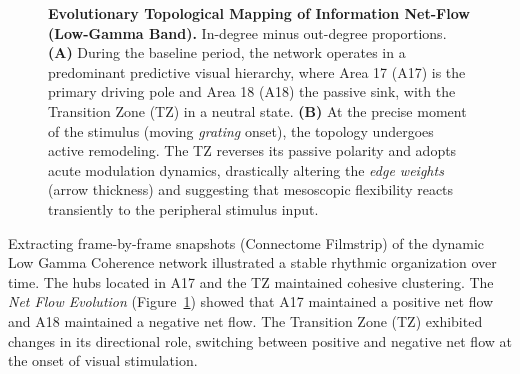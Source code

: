 \begin{figure}[H]
    \caption[Evolutionary Mapping of Net Flow]{\textbf{Evolutionary Topological Mapping of Information Net-Flow (Low-Gamma Band).} In-degree minus out-degree proportions. \textbf{(A)} During the baseline period, the network operates in a predominant predictive visual hierarchy, where Area 17 (A17) is the primary driving pole and Area 18 (A18) the passive sink, with the Transition Zone (TZ) in a neutral state. \textbf{(B)} At the precise moment of the stimulus (moving \textit{grating} onset), the topology undergoes active remodeling. The TZ reverses its passive polarity and adopts acute modulation dynamics, drastically altering the \textit{edge weights} (arrow thickness) and suggesting that mesoscopic flexibility reacts transiently to the peripheral stimulus input.}
    \label{fig:netflow_evolution}
\end{figure}

\vspace{0.5cm}

Extracting frame-by-frame snapshots (Connectome Filmstrip) of the dynamic Low Gamma Coherence network illustrated a stable rhythmic organization over time. The hubs located in A17 and the TZ maintained cohesive clustering. The \textit{Net Flow Evolution} (Figure~\ref{fig:netflow_evolution}) showed that A17 maintained a positive net flow and A18 maintained a negative net flow. The Transition Zone (TZ) exhibited changes in its directional role, switching between positive and negative net flow at the onset of visual stimulation.